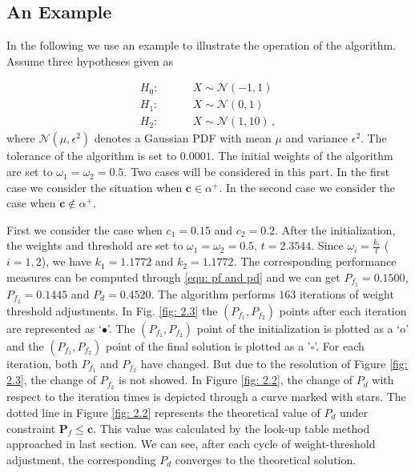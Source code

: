 \subsection{An Example}
In the following we use an example to illustrate the operation of the algorithm. Assume three hypotheses given as

\begin{equation}
\label{equ: Gaussian Hypothesis}
\begin{split}
	H_0:\;\;\;\;\;\;\;\;&X \sim \mathcal{N}(-1,1)\\
    H_1:\;\;\;\;\;\;\;\;&X \sim \mathcal{N}(0,1)\\
    H_2:\;\;\;\;\;\;\;\;&X \sim \mathcal{N}(1,10)\,,
\end{split}
\end{equation}
where $\mathcal{N}(\mu, \epsilon^2)$ denotes a Gaussian PDF with mean $\mu$ and variance $\epsilon^2$.
The tolerance of the algorithm is set to $0.0001$. The initial weights of the algorithm are set to $\omega_1 = \omega_2 = 0.5$. 
Two cases will be considered in this part. In the first case we consider the situation when $\mathbf{c} \in \alpha^+$. In the second case we consider the case when $\mathbf{c} \notin \alpha^+$.

First we consider the case when $c_1 = 0.15$ and $c_2 = 0.2$.
After the initialization, the weights and threshold are set to $\omega_1 = \omega_2 = 0.5$, $t =2.3544$. 
Since $\omega_i = \frac{k_i}{t}$ ($i = 1, 2$), we have $k_1 = 1.1772$ and $k_2 = 1.1772$. 
The corresponding performance measures can be computed through \eqref{equ: pf and pd} and we can get $P_{f_1}  = 0.1500$, $P_{f_2} = 0.1445$ and $P_d = 0.4520$. The algorithm performs $163$ iterations of weight threshold adjustments. In Fig. \ref{fig: 2.3} the $(P_{f_1}, P_{f_2})$  points after each iteration are represented as `$\bullet$'. 
The $(P_{f_1}, P_{f_2})$ point of the initialization is plotted as  a `o' and the $(P_{f_1}, P_{f_2})$ point of the final solution is plotted as a '$\square$'. For each iteration, both $P_{f_1}$ and $P_{f_2}$ have changed. But due to the resolution of Figure \ref{fig: 2.3}, the change of $P_{f_2}$ is not showed. 
In Figure \ref{fig: 2.2}, the change of $P_d$ with respect to the iteration times is depicted through a curve marked with stars.   
The dotted line in Figure \ref{fig: 2.2} represents the theoretical value of $P_d$ under constraint $\mathbf{P}_f \leq \mathbf{c}$. This value was calculated by the look-up table method approached in last section. We can see, after each cycle of weight-threshold adjustment, the corresponding $P_d$ converges to the theoretical solution. 

